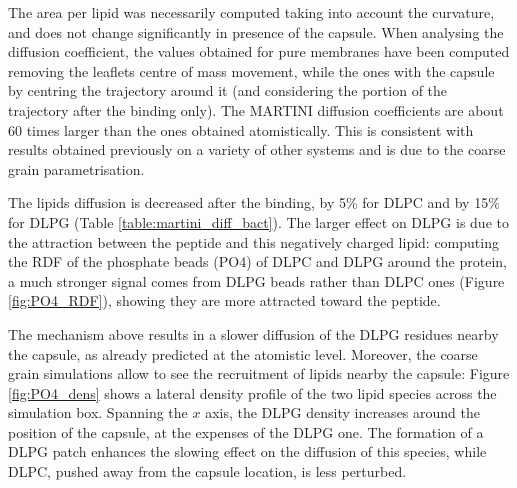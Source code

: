 %
The area per lipid was necessarily computed taking into account the curvature, and does not change significantly in presence of the capsule.
%
When analysing the diffusion coefficient, the values obtained for pure membranes have been computed removing the leaflets centre of mass movement, while the ones with the capsule by centring the trajectory around it (and considering the portion of the trajectory after the binding only). The MARTINI diffusion coefficients are about 60 times larger than the ones obtained atomistically. This is consistent with results obtained previously on a variety of other systems \cite{Venable2017} and is due to the coarse grain parametrisation.

The lipids diffusion is decreased after the binding, by 5\% for DLPC and by 15\% for DLPG (Table \ref{table:martini_diff_bact}). The larger effect on DLPG is due to the attraction between the peptide and this negatively charged lipid: computing the RDF of the phosphate beads (PO4) of DLPC and DLPG around the protein, a much stronger signal comes from DLPG beads rather than DLPC ones (Figure \ref{fig:PO4_RDF}), showing they are more attracted toward the peptide.

The mechanism above results in a slower diffusion of the DLPG residues nearby the capsule, as already predicted at the atomistic level. Moreover, the coarse grain simulations allow to see the recruitment of lipids nearby the capsule: Figure \ref{fig:PO4_dens} shows a lateral density profile of the two lipid species across the simulation box. Spanning the $x$ axis, the DLPG density increases around the position of the capsule, at the expenses of the DLPG one. The formation of a DLPG patch enhances the slowing effect on the diffusion of this species, while DLPC, pushed away from the capsule location, is less perturbed.

